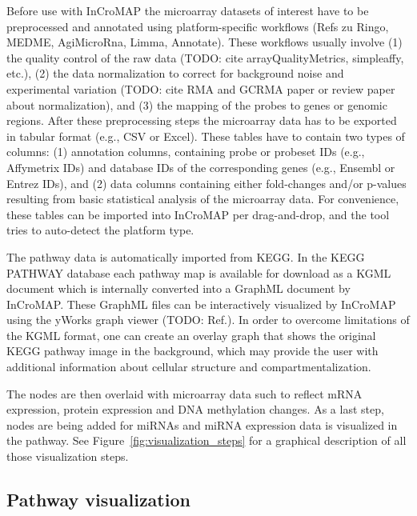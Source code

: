 \documentclass{bioinfo}
\begin{document}
Before use with InCroMAP the microarray datasets of interest have to be preprocessed and annotated
using platform-specific workflows (Refs zu Ringo, MEDME, AgiMicroRna, Limma, Annotate). These
workflows usually involve (1) the quality control of the raw data (TODO: cite arrayQualityMetrics,
simpleaffy, etc.), (2) the data normalization to correct for background noise and experimental
variation (TODO: cite RMA and GCRMA paper or review paper about normalization), and (3) the mapping
of the probes to genes or genomic regions. After these preprocessing steps the microarray data has
to be exported in tabular format (e.g., CSV or Excel). These tables have to contain two types of
columns: (1) annotation columns, containing probe or probeset IDs (e.g., Affymetrix IDs) and
database IDs of the corresponding genes (e.g., Ensembl or Entrez IDs), and (2) data columns
containing either fold-changes and/or p-values resulting from basic statistical analysis of the
microarray data. For convenience, these tables can be imported into InCroMAP per drag-and-drop, and
the tool tries to auto-detect the platform type.  

The pathway data is automatically imported from KEGG. In the KEGG PATHWAY database each pathway map
is available for download as a KGML document which is internally converted into a GraphML document
by InCroMAP. These GraphML files can be interactively visualized by InCroMAP using the yWorks graph
viewer (TODO: Ref.). In order to overcome limitations of the KGML format, one can create an overlay
graph that shows the original KEGG pathway image in the background, which may provide the user with
additional information about cellular structure and compartmentalization.  

The nodes are then overlaid with microarray data such to reflect mRNA expression, protein expression
and DNA methylation changes. As a last step, nodes are being added for miRNAs and miRNA expression
data is visualized in the pathway. See Figure~\ref{fig:visualization_steps} for a graphical
description of all those visualization steps.

\subsection{Pathway visualization} 
\end{document}
